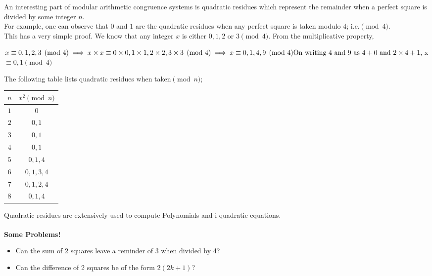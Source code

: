 \begin{mathbox}{}
{An interesting part of modular arithmetic congruence systems is quadratic residues which represent the remainder when a perfect square is divided by some integer $n$. \\
For example, one can observe that $0$ and $1$ are the quadratic residues when any perfect square is taken modulo $4$; i.e.$\pmod 4$.\\
This has a very simple proof. We know that any integer $x$ is either $0, 1, 2$ or $3 \pmod 4$. From the multiplicative property,
\begin{center}
    $x \equiv 0, 1, 2, 3 \pmod 4\\
    \implies x \times x \equiv 0 \times 0, 1 \times 1, 2 \times 2, 3 \times 3 \pmod 4\\
    \implies x \equiv 0, 1, 4, 9 \pmod 4\\
    \text{On writing $4$ and $9$ as $4 + 0$ and $2\times 4 + 1$},\\
    $x$ \equiv 0, 1 \pmod 4$
\end{center}
The following table lists quadratic residues when taken$\pmod n$;
\begin{center}
\begin{tabular}{ |c|c| } 
    \hline
    $n$ & $x^2 \pmod n$\\
    \hline
    $1$ & $0$\\
    $2$ & $0, 1$\\
    $3$ & $0, 1$\\
    $4$ & $0, 1$\\
    $5$ & $0, 1, 4$\\
    $6$ & $0, 1, 3, 4$\\
    $7$ & $0, 1, 2, 4$\\
    $8$ & $0, 1, 4$\\
    \hline
\end{tabular}
\end{center}
Quadratic residues are extensively used to compute Polynomials and i quadratic equations.
\\\\
\textbf{Some Problems! } 
\begin{itemize}
    \item{Can the sum of 2 squares leave a reminder of $3$ when divided by 4?}
    \item{Can the difference of 2 squares be of the form $2(2k+1)$?}
\end{itemize}}
\end{mathbox}
